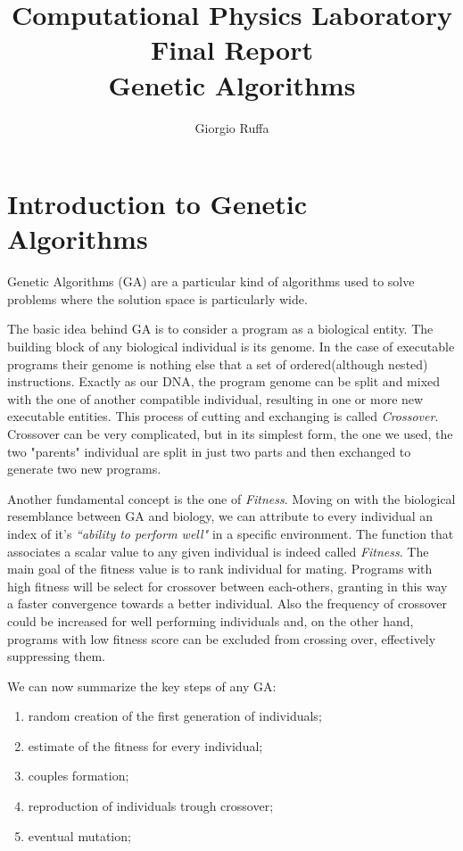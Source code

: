 \documentclass[12pt, a4paper]{article}
\title{%
	Computational Physics Laboratory\\
	\large Final Report\\
	Genetic Algorithms}
\author{Giorgio Ruffa}
\begin{document}
\maketitle

\tableofcontents

\section{Introduction to Genetic Algorithms}
\label{sec:intro}
Genetic Algorithms (GA) are a particular kind of algorithms used to solve problems where the solution space is particularly wide.

The basic idea behind GA is to consider a program as a biological entity. The building block of any biological individual is its genome. In the case of executable programs their genome is nothing else that a set of ordered(although nested) instructions.
Exactly as our DNA, the program genome can be split and mixed with the one of another compatible individual, resulting in one or more new executable entities.
This process of cutting and exchanging is called \textit{Crossover}.
Crossover can be very complicated, but in its simplest form, the one we used, the two "parents" individual are split in just two parts and then exchanged to generate two new programs.

Another fundamental concept is the one of \textit{Fitness}. Moving on with the biological resemblance between GA and biology, we can attribute to every individual an index of it's \textit{``ability to perform well"} in a specific environment. The function that associates a scalar value to any given individual is indeed called \textit{Fitness}.
The main goal of the fitness value is to rank individual for mating. Programs with high fitness will be select for crossover between each-others, granting in this way a faster convergence towards a better individual. Also the frequency of crossover could be increased for well performing individuals and, on the other hand, programs with low fitness score can be excluded from crossing over, effectively suppressing them.

We can now summarize the key steps of any GA:

\begin{enumerate}
	\item random creation of the first generation of individuals;
	\item estimate of the fitness for every individual;
	\item couples formation;
	\item reproduction of individuals trough crossover;
	\item eventual mutation;
\end{enumerate}
\end{document}
